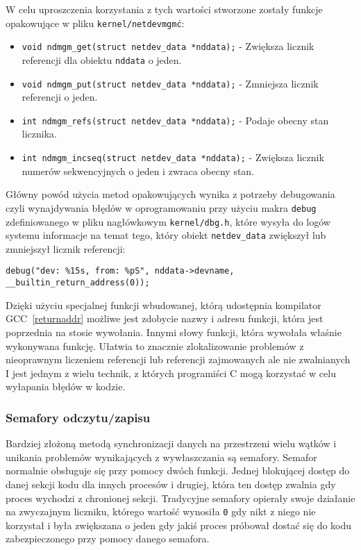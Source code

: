 \documentclass[10pt]{article}
\begin{document}
W celu uproszczenia korzystania z tych wartości stworzone zostały funkcje opakowujące w pliku \texttt{kernel/netdevmgm\.c}:

\begin{itemize}
\itemsep1pt\parskip0pt
\item
  \texttt{void ndmgm\_get(struct netdev\_data *nddata);} - Zwiększa licznik referencji dla obiektu \texttt{nddata} o jeden.
\item
  \texttt{void ndmgm\_put(struct netdev\_data *nddata);} - Zmniejsza licznik referencji o jeden.
\item
  \texttt{int ndmgm\_refs(struct netdev\_data *nddata);} - Podaje obecny stan licznika.
\item
  \texttt{int ndmgm\_incseq(struct netdev\_data *nddata);} - Zwiększa licznik numerów sekwencyjnych o jeden i zwraca obecny stan.
\end{itemize}

Główny powód użycia metod opakowujących wynika z potrzeby debugowania czyli wynajdywania błędów w oprogramowaniu przy użyciu makra \texttt{debug} zdefiniowanego w pliku nagłówkowym \texttt{kernel/dbg.h}, które wysyła do logów systemu informacje na temat tego, który obiekt \texttt{netdev\_data} zwiększył lub zmniejszył licznik referencji:

\begin{verbatim}
debug("dev: %15s, from: %pS", nddata->devname, __builtin_return_address(0));
\end{verbatim}

Dzięki użyciu specjalnej funkcji wbudowanej, którą udostępnia kompilator GCC~\ref{returnaddr} możliwe jest zdobycie nazwy i adresu funkcji, która jest poprzednia na stosie wywołania. Innymi słowy funkcji, która wywołała właśnie wykonywana funkcję. Ułatwia to znacznie zlokalizowanie problemów z nieoprawnym liczeniem referencji lub referencji zajmowanych ale nie zwalnianych I jest jednym z wielu technik, z których programiści C mogą korzystać w celu wyłapania błędów w kodzie.

\subsubsection{Semafory odczytu/zapisu}

Bardziej złożoną metodą synchronizacji danych na przestrzeni wielu wątków i unikania problemów wynikających z wywłaszczania są semafory.  Semafor normalnie obsługuje się przy pomocy dwóch funkcji. Jednej blokującej dostęp do danej sekcji kodu dla innych procesów i drugiej, która ten dostęp zwalnia gdy proces wychodzi z chronionej sekcji.  Tradycyjne semafory opierały swoje działanie na zwyczajnym liczniku, którego wartość wynosiła \texttt{0} gdy nikt z niego nie korzystał i była zwiększana o jeden gdy jakiś proces próbował dostać się do kodu zabezpieczonego przy pomocy danego semafora.
\end{document}

